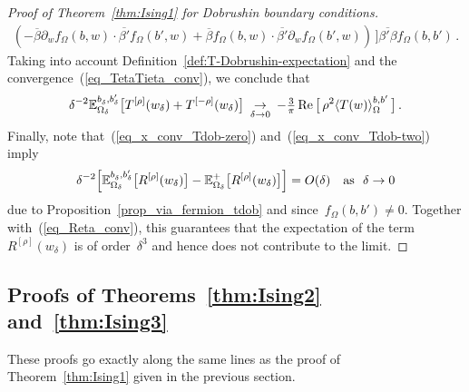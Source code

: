 \documentclass[reqno,11pt,a4paper]{amsart}
\theoremstyle{remark}
\newcommand{\Trho}{T^{[\rho]}}
\newcommand{\Rrho}{R^{[\rho]}}
\newcommand{\Tmrho}{T^{\left[-\rho \right]}}
\newcommand{\dob}{{b,b'}}
\newcommand{\Edelta}{\mathbb{E}_{\Omega_\delta}}
\newcommand{\f}{f_{\Omega}}
\renewcommand\Re{\operatorname{Re}}
\newcommand\Corr[1]{\langle #1 \rangle}
\begin{document}
\begin{proof}[Proof of Theorem~\ref{thm:Ising1} for Dobrushin boundary conditions]
\begin{align*}
{(-\overline{\beta}\partial_w\f(b,w)\cdot \overline{\beta'}\f(b',w)+\overline{\beta}\f(b,w)\cdot \overline{\beta'}\partial_w\f(b',w))\,]}{\overline{\beta'\beta}\f(b,b')}\,.
\end{align*}
Taking into account Definition~\ref{def:T-Dobrushin-expectation} and the convergence~(\ref{eq_TetaTieta_conv}), we conclude that
\[
\delta^{-2}\Edelta^{b^{\vphantom{\prime}}_\delta,b'_\delta}\big[\Trho(w_\delta)+\Tmrho(w_\delta)\big]\ \mathop{\to}_{\delta\to 0}\ -\tfrac{3}{\pi}\Re\big[\,\rho^2\Corr{T(w)}_\Omega^\dob\,\big]\,.
\]
Finally, note that~(\ref{eq_x_conv_Tdob-zero}) and~(\ref{eq_x_conv_Tdob-two}) imply
\[
\delta^{-2}\Big[ \Edelta^{b^{\vphantom{\prime}}_\delta,b'_\delta}\big[\Rrho(w_\delta)\big]-\Edelta^+\big[\Rrho(w_\delta)\big]\Big]=O(\delta)\quad\text{as}\ \ \delta\to 0
\]
due to Proposition~\ref{prop_via_fermion_tdob} and since~$\f(b,b')\ne 0$. Together with~(\ref{eq_Reta_conv}), this guarantees that the expectation of the term~$\Rrho(w_\delta)$ is of order~$\delta^3$ and hence does not contribute to the limit.
\end{proof}

\subsection{Proofs of Theorems~\ref{thm:Ising2} and~\ref{thm:Ising3}} \label{sub:convergence-theorem1}

These proofs go exactly along the same lines as the proof of Theorem~\ref{thm:Ising1} given in the previous section.
\end{document}
